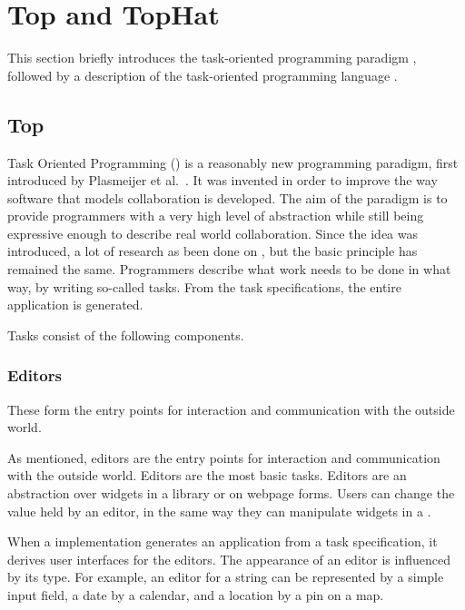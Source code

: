 
\section{Top and TopHat}
\label{sec:tophat}
This section briefly introduces the task-oriented programming paradigm \TOP,
followed by a description of the task-oriented programming language \TOPHAT.



\subsection{Top}

Task Oriented Programming (\TOP) is a reasonably new programming paradigm, first introduced by Plasmeijer et al.~\cite{DBLP:conf/ppdp/PlasmeijerLMAK12}.
It was invented in order to improve the way software that models collaboration is developed.
The aim of the paradigm is to provide programmers with a very high level of abstraction while still being expressive enough to describe real world collaboration.
Since the idea was introduced, a lot of research as been done on \TOP, but the basic principle has remained the same.
Programmers describe what work needs to be done in what way, by writing so-called tasks.
From the task specifications, the entire application is generated.

Tasks consist of the following components.

\subsubsection{Editors}

  These form the entry points for interaction and communication with the outside world.

  As mentioned, editors are the entry points for interaction and communication with the outside world.
  Editors are the most basic tasks.
  Editors are an abstraction over widgets in a \GUI library or on webpage forms.
  Users can change the value held by an editor, in the same way they can manipulate widgets in a \GUI.

  When a \TOP implementation generates an application from a task specification, it derives user interfaces for the editors.
  The appearance of an editor is influenced by its type.
  For example, an editor for a string can be represented by a simple input field, a date by a calendar, and a location by a pin on a map.


